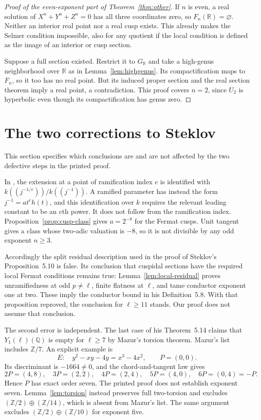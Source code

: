 \documentclass[11pt,a4paper]{article}
\newcommand{\Q}{\mathbb Q}
\newcommand{\Z}{\mathbb Z}
\newcommand{\R}{\mathbb R}
\theoremstyle{plain}
\theoremstyle{definition}
\begin{document}
\begin{proof}[Proof of the even-exponent part of Theorem~\ref{thm:other}]
If $n$ is even, a real solution of
$X^n+Y^n+Z^n=0$ has all three coordinates zero, so
$F_n(\R)=\varnothing$. Neither an interior real point nor a real
cusp exists. This already makes the Selmer condition impossible,
also for any quotient if the local condition is defined as the
image of an interior or cusp section.

Suppose a full section existed. Restrict it to $G_\R$ and take a
high-genus neighborhood over $\R$ as in
Lemma~\ref{lem:highgenus}. Its compactification maps to $F_n$,
so it too has no real point. But its induced proper section and
the real section theorem imply a real point, a contradiction.
This proof covers $n=2$, since $U_2$ is hyperbolic even though
its compactification has genus zero.
\end{proof}

\section{The two corrections to Steklov}\label{sec:corrections}

This section specifies which conclusions are and are not affected by the
two defective steps in the printed proof.

In \citet[Proposition~4.6]{steklov}, the extension at a point of
ramification index $e$ is identified with
$k((j^{-1/e}))/k((j^{-1}))$. A ramified parameter has instead the
form $j^{-1}=a t^e h(t)$, and this identification over $k$ requires
the relevant leading constant to be an $e$th power. It does not
follow from the ramification index. Proposition~\ref{prop:cusp-class}
gives $a=2^{-8}$ for the Fermat cusps. Unit tangent gives a class
whose two-adic valuation is $-8$, so it is not divisible by any
odd exponent $n\geq3$.

Accordingly the split residual description used in the proof of
Steklov's Proposition~5.10 is false. Its conclusion that cuspidal
sections have the required local Fermat conditions remains true:
Lemma~\ref{lem:local-residual} proves unramifiedness at odd
$p\neq\ell$, finite flatness at $\ell$, and tame conductor exponent
one at two. These imply the conductor bound in his Definition~5.8.
With that proposition reproved, the conclusion for
$\ell\geq11$ stands. Our proof does not assume that conclusion.

The second error is independent. The last case of his Theorem~5.14
claims that $Y_1(\ell)(\Q)$ is empty for $\ell\geq7$ by Mazur's
torsion theorem. Mazur's list includes $\Z/7$. An explicit example is
\[
 E:\quad y^2-xy-4y=x^3-4x^2,
 \qquad P=(0,0).
\]
Its discriminant is $-1664\neq0$, and the chord-and-tangent law gives
\[
 2P=(4,8),\quad3P=(2,2),\quad4P=(2,4),\quad
 5P=(4,0),\quad6P=(0,4)=-P.
\]
Hence $P$ has exact order seven. The printed proof does not establish
exponent seven. Lemma~\ref{lem:torsion} instead preserves full
two-torsion and excludes $(\Z/2)\oplus(\Z/14)$, which is absent
from Mazur's list. The same argument excludes
$(\Z/2)\oplus(\Z/10)$ for exponent five.
\end{document}
